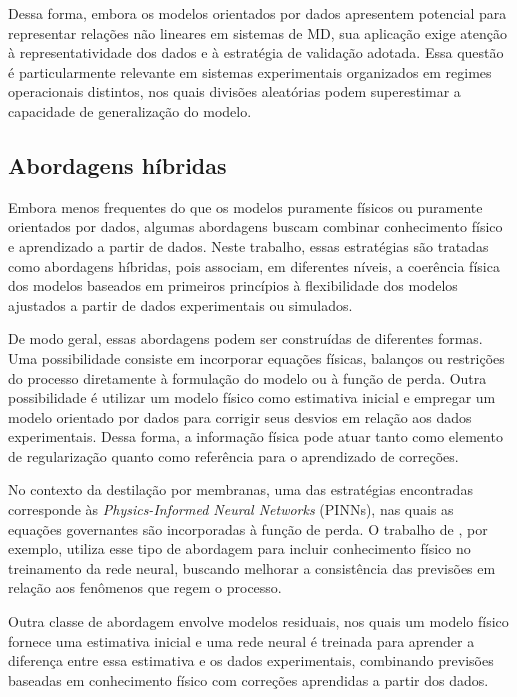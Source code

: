 Dessa forma, embora os modelos orientados por dados apresentem potencial para representar relações não lineares em sistemas de MD, sua aplicação exige atenção à representatividade dos dados e à estratégia de validação adotada. Essa questão é particularmente relevante em sistemas experimentais organizados em regimes operacionais distintos, nos quais divisões aleatórias podem superestimar a capacidade de generalização do modelo.

\subsection{Abordagens híbridas}

Embora menos frequentes do que os modelos puramente físicos ou puramente orientados por dados, algumas abordagens buscam combinar conhecimento físico e aprendizado a partir de dados. Neste trabalho, essas estratégias são tratadas como abordagens híbridas, pois associam, em diferentes níveis, a coerência física dos modelos baseados em primeiros princípios à flexibilidade dos modelos ajustados a partir de dados experimentais ou simulados.

De modo geral, essas abordagens podem ser construídas de diferentes formas. Uma possibilidade consiste em incorporar equações físicas, balanços ou restrições do processo diretamente à formulação do modelo ou à função de perda. Outra possibilidade é utilizar um modelo físico como estimativa inicial e empregar um modelo orientado por dados para corrigir seus desvios em relação aos dados experimentais. Dessa forma, a informação física pode atuar tanto como elemento de regularização quanto como referência para o aprendizado de correções.

No contexto da destilação por membranas, uma das estratégias encontradas corresponde às \textit{Physics-Informed Neural Networks} (PINNs), nas quais as equações governantes são incorporadas à função de perda. O trabalho de \cite{PINN_MD}, por exemplo, utiliza esse tipo de abordagem para incluir conhecimento físico no treinamento da rede neural, buscando melhorar a consistência das previsões em relação aos fenômenos que regem o processo.

Outra classe de abordagem envolve modelos residuais, nos quais um modelo físico fornece uma estimativa inicial e uma rede neural é treinada para aprender a diferença entre essa estimativa e os dados experimentais, combinando previsões baseadas em conhecimento físico com correções aprendidas a partir dos dados.

